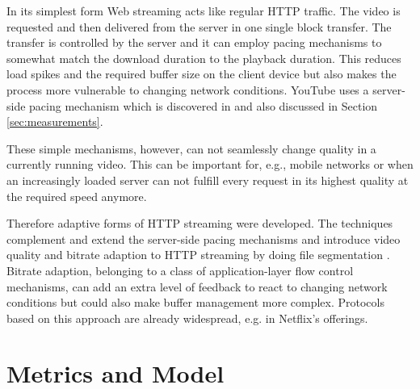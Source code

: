In its simplest form Web streaming acts like regular HTTP traffic. The video is requested and then delivered from the server in one single block transfer. The transfer is controlled by the server and it can employ pacing mechanisms to somewhat match the download duration to the playback duration. This reduces load spikes and the required buffer size on the client device but also makes the process more vulnerable to changing network conditions. YouTube uses a server-side pacing mechanism which is  discovered in \cite{alcock2011afcyt} and also discussed in Section \ref{sec:measurements}.

These simple mechanisms, however, can not seamlessly change quality in a currently running video. This can be important for, e.g., mobile networks or when an increasingly loaded server can not fulfill every request in its highest quality at the required speed anymore.

Therefore adaptive forms of HTTP streaming were developed. The techniques complement and extend the server-side pacing mechanisms and introduce video quality and bitrate adaption to HTTP streaming by doing file segmentation \cite{ma2011mobile, 5677508}. Bitrate adaption, belonging to a class of application-layer flow control mechanisms, can add an extra level of feedback to react to changing network conditions but could also make buffer management more complex. Protocols based on this approach are already widespread, e.g. in Netflix's offerings.





\section{Metrics and Model}
\label{sec:metricsmodel}


